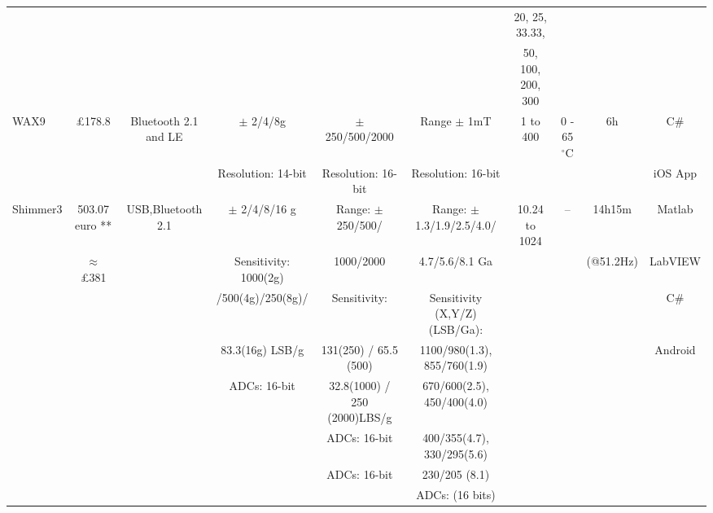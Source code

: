 \begin{landscape}
\begin{tabular}{l*{9}{c}}
& & &  &  &
&  20, 25, 33.33,  & & & \\

& & &  &  &
& 50, 100, 200, 300   & & & \\




\hline
WAX9   & \pounds 178.8 & Bluetooth 2.1 and LE & $\pm$ 2/4/8g  & $\pm$ 250/500/2000  & Range $\pm$ 1mT
& 1 to 400  & 0 - 65$^{\circ}$C  & 6h & C\#  \\
 & &  & Resolution: 14-bit & Resolution: 16-bit & Resolution: 16-bit & & &  & iOS App \\


%
%
%


\hline
Shimmer3 & 503.07 euro ** & USB,Bluetooth 2.1 & $\pm$ 2/4/8/16 g  & Range: $\pm$ 250/500/& Range: $\pm$1.3/1.9/2.5/4.0/
& 10.24 to 1024 & -- & 14h15m  & Matlab  \\
 &  $\approx$ \pounds  381  & &Sensitivity: 1000(2g)  & 1000/2000 & 4.7/5.6/8.1 Ga & & & (@51.2Hz) & LabVIEW   \\
& &  &   /500(4g)/250(8g)/  &  Sensitivity: & Sensitivity (X,Y/Z) (LSB/Ga): & & & & C\#   \\
& & & 83.3(16g) LSB/g&  131(250) / 65.5 (500)  & 1100/980(1.3), 855/760(1.9)  & & & & Android \\
& & &  ADCs: 16-bit&   32.8(1000) / 250 (2000)LBS/g  & 670/600(2.5), 450/400(4.0) & & & &  \\
& & & & ADCs: 16-bit &  400/355(4.7), 330/295(5.6) & & & &  \\
& & & & ADCs: 16-bit & 230/205 (8.1) & & & &  \\
& & & &  & ADCs: (16 bits)& & & &  \\
\hline





\end{tabular}
\end{landscape}
